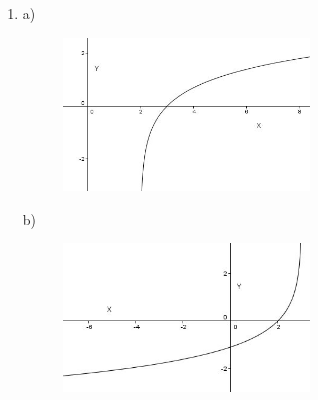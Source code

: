 \documentclass[12pt]{article}
\begin{document}
\vspace{\baselineskip}
\begin{enumerate}
	\item a)\par




\begin{figure}[H]
	\begin{Center}
		\includegraphics[width=2.58in,height=1.6in]{./media/image30.JPG}
	\end{Center}
\end{figure}



\par


\vspace{\baselineskip}
b)\par




\begin{figure}[H]
	\begin{Center}
		\includegraphics[width=2.58in,height=1.55in]{./media/image31.JPG}
	\end{Center}
\end{figure}



\par



\end{enumerate}
\end{document}

